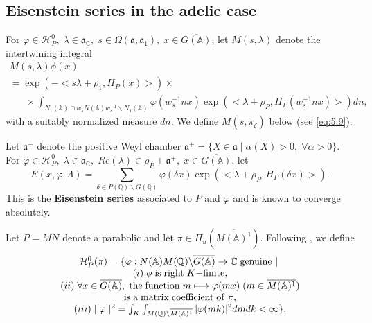 \subsection{Eisenstein series in the adelic case}

For $\varphi \in {\mathcal H}_P^0,\;\lambda \in {\mathfrak{a}}_{{\mathbb C}},\;s\in
\Omega ({\mathfrak{a}},{\mathfrak{a}}_1),\;x\in \overline{G({\mathbb{A}})}$, let
$M(s,\lambda)$ denote the intertwining integral
\begin{equation}\label{eq:5.5}
\begin{array}{c}
M(s,\lambda )\phi(x) \\ 
=\exp (-<s\lambda +\rho _1,H_P(x)>)\times \;\;\;\;\;\;\;\;\;\;\;\;\; \\ 
\;\;\;\;\;\;\times
\int_{N_1({\mathbb{A}})\cap w_sN({\mathbb{A}})w_s^{-1}\backslash
N_1({\mathbb{A}})}\varphi (w_s^{-1}nx)
\exp (<\lambda +\rho_P,H_P(w_s^{-1}nx)>)dn,
\end{array}
\end{equation}
with a suitably normalized measure $dn$.
We define $M(s,\pi_\zeta)$ below (see \eqref{eq:5.9}).

Let ${\mathfrak{a}}^{+}$ denote the positive Weyl chamber ${\mathfrak{a}}^{+}=\{X\in 
{\mathfrak{a}}\;|\;\alpha (X)>0,\;\forall \alpha >0\}$.
For $\varphi \in {\mathcal{H}}_P^0,
\;\lambda \in {\mathfrak{a}}_{{\mathbb C}},
\;Re(\lambda )\in \rho _P+{\mathfrak{a}}^{+},
\;x\in \overline{G({\mathbb{A}})}$, let 
\begin{equation}\label{eq:5.6}
E(x,\varphi ,\Lambda )=
\sum_{\delta \in P({\mathbb{Q}})\backslash G({\mathbb{Q}})}
\varphi (\delta x)\exp (<\lambda +\rho _P,H_P(\delta x)>).
\end{equation}
This is the {\bf Eisenstein series} associated to $P$ and $\varphi $ and is
known to converge absolutely. 

Let $P=MN$ denote a parabolic and let
$\pi \in \Pi _u(\overline{M({\mathbb{A}})^1})$.
Following \cite{A2}, we define 
\begin{equation}\label{eq:5.7}
\begin{array}{c}
{\mathcal H}_P^0(\pi )=\{\varphi :N({\mathbb{A}})M({\mathbb{Q}})
\backslash \overline{G({\mathbb{A}})}\rightarrow {\mathbb C}\;
{\rm genuine\ }|\; \\ 
(i)\;\phi \;{\rm is\;right}\;K{\rm -finite,} \\ 
(ii)\;\forall x\in \overline{G({\mathbb{A}})},
\;{\rm the\;function}\;m\longmapsto \varphi (mx)
\;(m\in \overline{M({{\mathbb{A}}})^1}) \\ 
{\rm is\;a\;matrix\;coefficient\;of}\;\pi , \\ 
(iii)\;||\varphi ||^2
=\int_K\int_{M({\mathbb{Q}})\backslash \overline{M({\mathbb{A}})^1}}|
\varphi (mk)|^2dmdk<\infty \}.
\end{array}
\end{equation}

